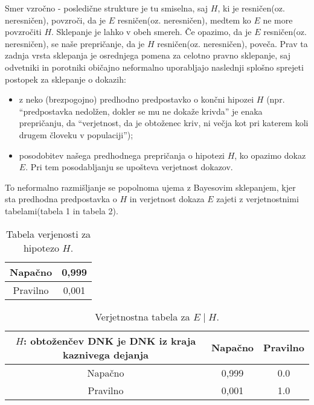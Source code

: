 \documentclass[a4paper,12pt]{article}
\begin{document}
Smer vzročno - posledične strukture je tu smiselna, saj $H$, ki je resničen(oz. neresničen), povzroči, da je $E$ resničen(oz. neresničen), 
medtem ko $E$ ne more povzročiti $H$. Sklepanje je lahko v obeh smereh. Če opazimo, da je $E$ resničen(oz. neresničen), se naše prepričanje, 
da je $H$ resničen(oz. neresničen), poveča. Prav ta zadnja vrsta sklepanja je osrednjega pomena za celotno pravno sklepanje, saj odvetniki in 
porotniki običajno neformalno uporabljajo naslednji splošno sprejeti postopek za sklepanje o dokazih:
\begin{itemize}
    \item z neko (brezpogojno) predhodno predpostavko o končni hipozei $H$ (npr. "`predpostavka nedolžen, dokler se mu ne dokaže krivda"' je enaka 
    prepričanju, da "`verjetnost, da je obtoženec kriv, ni večja kot pri katerem koli drugem človeku v populaciji"');
    \item posodobitev našega predhodnega prepričanja o hipotezi $H$, ko opazimo dokaz $E$. Pri tem posodabljanju se upošteva verjetnost dokazov.
\end{itemize}

To neformalno razmišljanje se popolnoma ujema z Bayesovim sklepanjem, kjer sta predhodna predpostavka o $H$ in verjetnost dokaza $E$ zajeti z 
verjetnostnimi tabelami(tabela 1 in tabela 2).

\begin{table}[h!]
\begin{center}
    \begin{tabular}{|c|c|} 
     \hline
     Napačno & 0,999 \\ \hline
     Pravilno & 0,001 \\ \hline
    \end{tabular}
    \caption{Tabela verjenosti za hipotezo $H$.}
    \label{table:stevila}
\end{center}
\end{table}

\begin{table}[h!]
\begin{center}
    \begin{tabular}{|c|c|c|} 
     \hline
     $H$: obtoženčev DNK je DNK iz kraja kaznivega dejanja & Napačno & Pravilno \\ \hline
     Napačno & 0,999 & 0.0 \\ \hline
     Pravilno & 0,001 & 1.0 \\ \hline
    \end{tabular}
    \caption{Verjetnostna tabela za $E \mid H$.}
    \label{table:stevila}
\end{center}
\end{table}
\end{document}
